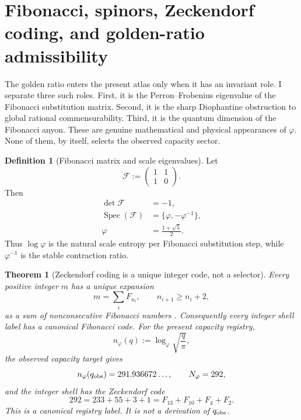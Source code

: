 \documentclass[aps,prd,reprint,nofootinbib,superscriptaddress,floatfix]{revtex4-2}
\numberwithin{equation}{section}
\theoremstyle{definition}
\newtheorem{definition}{Definition}[section]
\theoremstyle{plain}
\newtheorem{theorem}{Theorem}[section]
\begin{document}
\section{Fibonacci, spinors, Zeckendorf coding, and golden-ratio admissibility}

The golden ratio enters the present atlas only when it has an invariant
role.  I separate three such roles.  First, it is the Perron--Frobenius
eigenvalue of the Fibonacci substitution matrix.  Second, it is the sharp
Diophantine obstruction to global rational commensurability.  Third, it
is the quantum dimension of the Fibonacci anyon.  These are genuine
mathematical and physical appearances of \(\varphi\).  None of them, by
itself, selects the observed capacity sector.

\begin{definition}[Fibonacci matrix and scale eigenvalues]
Let
\begin{equation}
\mathcal F:=
\begin{pmatrix}
1&1\\
1&0
\end{pmatrix}.
\end{equation}
Then
\begin{align}
\det\mathcal F&=-1,\\
\operatorname{Spec}(\mathcal F)&=
\{\varphi,-\varphi^{-1}\},\\
\varphi&=\frac{1+\sqrt5}{2}.
\end{align}
Thus \(\log\varphi\) is the natural scale entropy per Fibonacci
substitution step, while \(\varphi^{-1}\) is the stable contraction
ratio.
\end{definition}

\begin{theorem}[Zeckendorf coding is a unique integer code, not a selector]
Every positive integer \(m\) has a unique expansion
\begin{equation}
m=\sum_i F_{n_i},
\qquad
n_{i+1}\ge n_i+2,
\end{equation}
as a sum of nonconsecutive Fibonacci numbers \cite{Zeckendorf1972}.
Consequently every integer shell label has a canonical Fibonacci code.
For the present capacity registry,
\begin{equation}
n_\varphi(q):=
\log_\varphi\sqrt{\frac{q}{\pi}},
\end{equation}
the observed capacity target gives
\begin{equation}
n_\varphi(q_{\rm obs})=291.936672\ldots ,
\qquad
N_\varphi=292,
\end{equation}
and the integer shell has the Zeckendorf code
\begin{equation}
292=233+55+3+1
=F_{13}+F_{10}+F_4+F_2 .
\end{equation}
This is a canonical registry label.  It is not a derivation of
\(q_{\rm obs}\).
\end{theorem}
\end{document}
